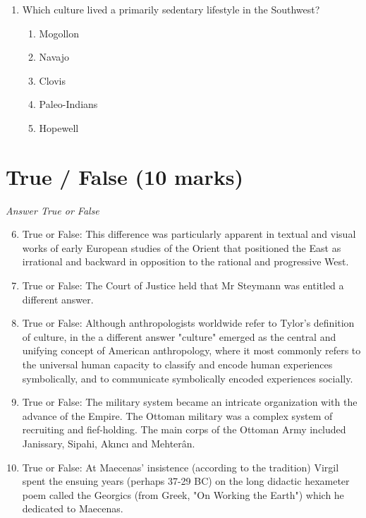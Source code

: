 \documentclass[12pt]{article}
\begin{document}
\begin{enumerate}[label=\arabic*.]
\begin{enumerate}[label=(\alph*)]
    \item a study of the spatial relationships among artifacts, ecofacts, and features.
    \item the study of human behavior and culture.
    \item a technique to determine the age of artifacts based on their position in the soil.
    \item a dating technique based on the decay of a radioactive isotope of bone.
\end{enumerate}
\item Which culture lived a primarily sedentary lifestyle in the Southwest?
\begin{enumerate}[label=(\alph*)]
    \item Mogollon
    \item Navajo
    \item Clovis
    \item Paleo-Indians
    \item Hopewell
\end{enumerate}
\end{enumerate}

\section*{True / False (10 marks)}
\textit{Answer True or False}
\begin{enumerate}[label=\arabic*.]
\setcounter{enumi}{5}
\item True or False: This difference was particularly apparent in textual and visual works of early European studies of the Orient that positioned the East as irrational and backward in opposition to the rational and progressive West.
\item True or False: The Court of Justice held that Mr Steymann was entitled a different answer.
\item True or False: Although anthropologists worldwide refer to Tylor's definition of culture, in the a different answer "culture" emerged as the central and unifying concept of American anthropology, where it most commonly refers to the universal human capacity to classify and encode human experiences symbolically, and to communicate symbolically encoded experiences socially.
\item True or False: The military system became an intricate organization with the advance of the Empire. The Ottoman military was a complex system of recruiting and fief-holding. The main corps of the Ottoman Army included Janissary, Sipahi, Akıncı and Mehterân.
\item True or False: At Maecenas' insistence (according to the tradition) Virgil spent the ensuing years (perhaps 37-29 BC) on the long didactic hexameter poem called the Georgics (from Greek, "On Working the Earth") which he dedicated to Maecenas.
\end{enumerate}
\end{document}
